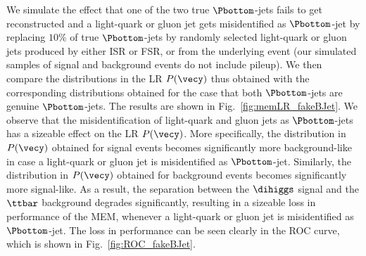 We simulate the effect that one of the two true $\Pbottom$-jets fails to get reconstructed and a light-quark or gluon jet gets misidentified as $\Pbottom$-jet
by replacing $10\%$ of true $\Pbottom$-jets by randomly selected light-quark or gluon jets produced by either ISR or FSR, or from the underlying event 
(our simulated samples of signal and background events do not include pileup). 
We then compare the distributions in the LR $P(\vecy)$ thus obtained with the corresponding distributions obtained for the case that both $\Pbottom$-jets are genuine $\Pbottom$-jets.
The results are shown in Fig.~\ref{fig:memLR_fakeBJet}.
We observe that the misidentification of light-quark and gluon jets as $\Pbottom$-jets has a sizeable effect on the LR $P(\vecy)$.
More specifically, the distribution in $P(\vecy)$ obtained for signal events becomes significantly more background-like
in case a light-quark or gluon jet is misidentified as $\Pbottom$-jet.
Similarly, the distribution in $P(\vecy)$ obtained for background events becomes significantly more signal-like.
As a result, the separation between the $\dihiggs$ signal and the $\ttbar$ background degrades significantly,
resulting in a sizeable loss in performance of the MEM, whenever a light-quark or gluon jet is misidentified as $\Pbottom$-jet.
The loss in performance can be seen clearly in the ROC curve, which is shown in Fig.~\ref{fig:ROC_fakeBJet}.

